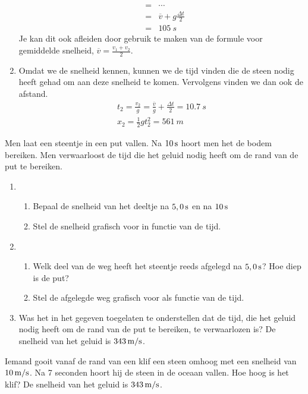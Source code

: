\documentclass{ximera}
\begin{document}
\begin{exercise}
\begin{oplossing}
\begin{enumerate}
\begin{eqnarray*}
&=&\cdots\\
&=&\overline{v}+g\frac{\Delta t}{2}\\
&=&\SI{105}{s}
\end{eqnarray*}
Je kan dit ook afleiden door gebruik te maken van de formule voor gemiddelde snelheid, $\overline{v}=\frac{v_1+v_2}{2}$.
\item Omdat we de snelheid kennen, kunnen we de tijd vinden die de steen nodig heeft gehad om aan deze snelheid te komen. Vervolgens vinden we dan ook de afstand.
\begin{eqnarray*}
t_2=\frac{v_2}{g}=\frac{\overline{v}}{g}+\frac{\Delta t}{2}=\SI{10,7}{s}\\
x_2=\frac{1}{2}gt_2^2=\SI{561}{m}
\end{eqnarray*}
\end{enumerate}
\end{oplossing}



\end{exercise}

\begin{exercise} Men laat een steentje in een put vallen. Na $10\rm\,s$ hoort
men het de bodem bereiken. Men verwaarloost de tijd die het geluid
nodig heeft om de rand van de put te bereiken.
\begin{enumerate}
\item
\begin{enumerate}
\item Bepaal de snelheid van het deeltje na $5,0\rm\,s$ en na $10\rm\,s$
\item Stel de snelheid grafisch voor in functie van de tijd.
\end{enumerate}
\item
\begin{enumerate}
\item Welk deel van de weg heeft het steentje reeds afgelegd na
$5,0\rm\,s$? Hoe diep is de put?
\item Stel de afgelegde weg grafisch voor als functie van de tijd.
\end{enumerate}
\item Was het in het gegeven toegelaten te onderstellen dat de tijd,
die het geluid nodig heeft om de rand van de put te bereiken, te
verwaarlozen is? De snelheid van het geluid is $343\rm\,m/s$.
\end{enumerate}

\end{exercise}

\begin{exercise} Iemand gooit vanaf de rand van een klif een steen omhoog met
een snelheid van $10\rm\,m/s$. Na 7 seconden hoort hij de steen in
de oceaan vallen. Hoe hoog is het klif? De snelheid van het geluid
is $343\rm\,m/s$.

\end{exercise}
\end{document}
